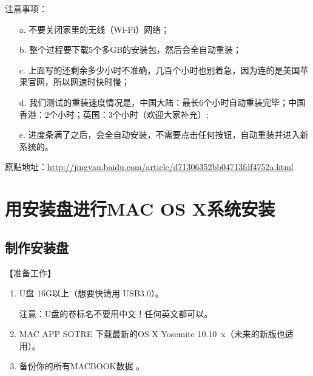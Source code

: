 \documentclass{article}
\begin{document}
注意事项：

\begin{enumerate}

\item[a.] 不要关闭家里的无线（Wi-Fi）网络；

\item[b.] 整个过程要下载5个多GB的安装包，然后会全自动重装；

\item[c.] 上面写的还剩余多少小时不准确，几百个小时也别着急，因为连的是美国苹果官网，所以网速时快时慢；

\item[d.] 我们测试的重装速度情况是，中国大陆：最长6个小时自动重装完毕；中国香港：2个小时；英国：3个小时（欢迎大家补充）;

\item[e.] 进度条满了之后，会全自动安装，不需要点击任何按钮，自动重装并进入新系统的。

\end{enumerate}

原贴地址：\url{http://jingyan.baidu.com/article/d71306352bb04713fdf4752a.html}

\section{用安装盘进行MAC OS X系统安装}
\subsection{制作安装盘}

【准备工作】
\begin{enumerate}
\item U盘 16G以上（想要快请用 USB3.0）。\par     
注意：U盘的卷标名不要用中文！任何英文都可以。
\item MAC APP SOTRE 下载最新的OS X Yosemite 10.10~x（未来的新版也适用）。
\item 备份你的所有MACBOOK数据 。 
\end{enumerate}
\end{document}
